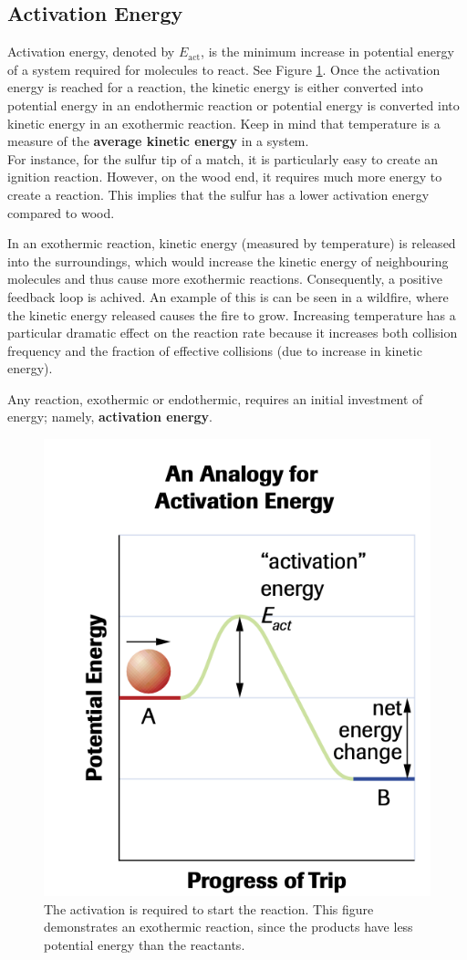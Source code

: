 \subsection{Activation Energy}
Activation energy, denoted by $E_\text{act}$, is the minimum increase in potential energy of a 
system required for molecules to react. See Figure \ref{fig:activation-energy}. Once the activation
energy is reached for a reaction, the kinetic energy is either converted into potential energy
in an endothermic reaction or potential energy is converted into kinetic energy in an exothermic
reaction. Keep in mind that temperature is a measure of the \textbf{average kinetic energy} in
a system.\\

For instance, for the sulfur tip of a match, it is particularly easy to create an ignition reaction.
However, on the wood end, it requires much more energy to create a reaction. This implies that
the sulfur has a lower activation energy compared to wood.

\begin{important}
    In an exothermic reaction, kinetic energy (measured by temperature) is released into the
    surroundings, which would increase the kinetic energy of neighbouring molecules and thus cause
    more exothermic reactions. Consequently, a positive feedback loop is achived. An example of
    this is can be seen in a wildfire, where the kinetic energy released causes the fire to grow.
    Increasing temperature has a particular dramatic effect on the reaction rate because it
    increases both collision frequency and the fraction of effective collisions (due to increase
    in kinetic energy).
\end{important}

\begin{important}
    Any reaction, exothermic or endothermic, requires an initial investment of energy; namely,
    \textbf{activation energy}.
\end{important}

\begin{figure}[ht!]
    \centering
    \includegraphics[width=0.5 \textwidth]{../figures/activation energy.png}
    \caption{The activation is required to start the reaction. This figure demonstrates an
        exothermic reaction, since the products have less potential energy than the reactants.}
    \label{fig:activation-energy}
\end{figure}

